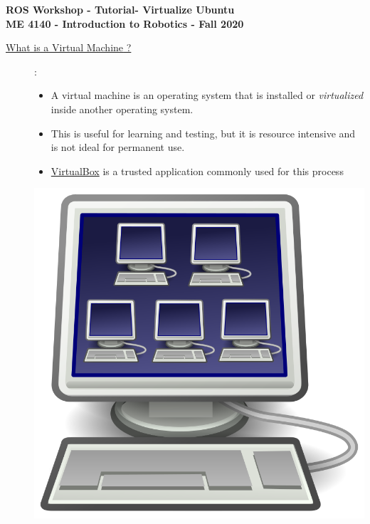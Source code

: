 \documentclass[12pt]{article}
\newcommand{\MNUM}{1} %
\newcommand{\MNAME}{Virtualize Ubuntu} %
\begin{document}
\thispagestyle{plain}

\begin{center}
   {\bf \Large ROS Workshop - Tutorial\hspc\MNUM\hspc - \MNAME}\vspace{3mm}\\
   {\bf \large ME 4140 - Introduction to Robotics - Fall 2020} \vspace{5mm}\\
\end{center}

\begin{description}

 	\item[\underline{What is a \href{https://en.wikipedia.org/wiki/Virtual_machine}{Virtual Machine} ?}]: \\
 	\begin{multicols}{2}
      		
            \begin{itemize}
                
                \item A virtual machine is an operating system that is installed or {\it virtualized} inside another operating system.
                \item This is useful for learning and testing, but it is resource intensive and is not ideal for permanent use. 
                \item \href{https://www.virtualbox.org/}{VirtualBox} is a trusted application commonly used for this process
                
            \end{itemize}
            \includegraphics[scale=.15]{CaptureA.png}\\
	\end{multicols}
	

\end{description}
\end{document}
